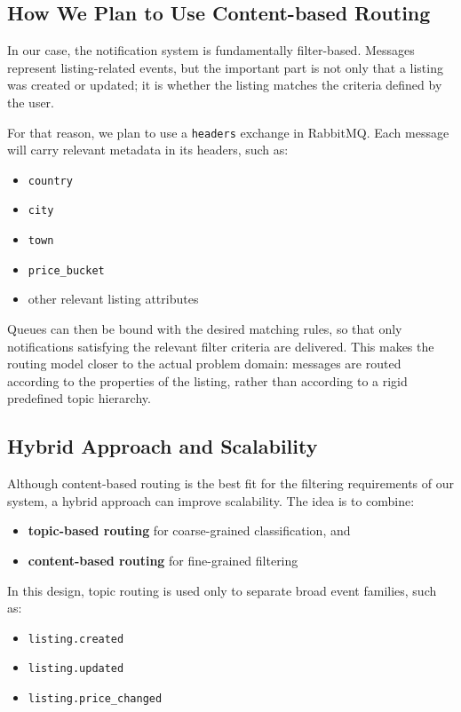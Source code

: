 \subsection{How We Plan to Use Content-based Routing}

In our case, the notification system is fundamentally filter-based. Messages represent listing-related events, but the important part is not only that a listing was created or updated; it is whether the listing matches the criteria defined by the user.

For that reason, we plan to use a \texttt{headers} exchange in RabbitMQ. Each message will carry relevant metadata in its headers, such as:
\begin{itemize}
    \item \texttt{country}
    \item \texttt{city}
    \item \texttt{town}
    \item \texttt{price\_bucket}
    \item other relevant listing attributes
\end{itemize}

Queues can then be bound with the desired matching rules, so that only notifications satisfying the relevant filter criteria are delivered. This makes the routing model closer to the actual problem domain: messages are routed according to the properties of the listing, rather than according to a rigid predefined topic hierarchy.

\subsection{Hybrid Approach and Scalability}

Although content-based routing is the best fit for the filtering requirements of our system, a hybrid approach can improve scalability. The idea is to combine:
\begin{itemize}
    \item \textbf{topic-based routing} for coarse-grained classification, and
    \item \textbf{content-based routing} for fine-grained filtering
\end{itemize}

In this design, topic routing is used only to separate broad event families, such as:
\begin{itemize}
    \item \texttt{listing.created}
    \item \texttt{listing.updated}
    \item \texttt{listing.price\_changed}
\end{itemize}

